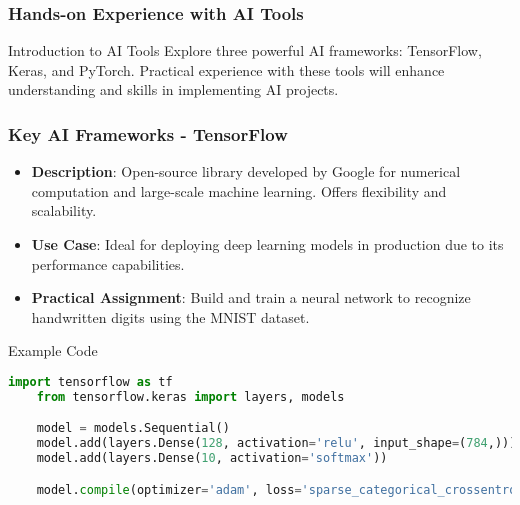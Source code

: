 \documentclass{beamer}
\begin{document}
\begin{frame}
    \frametitle{Hands-on Experience with AI Tools}
    \begin{block}{Introduction to AI Tools}
        Explore three powerful AI frameworks: TensorFlow, Keras, and PyTorch. 
        Practical experience with these tools will enhance understanding and skills in implementing AI projects.
    \end{block}
\end{frame}

\begin{frame}
    \frametitle{Key AI Frameworks - TensorFlow}
    \begin{itemize}
        \item \textbf{Description}: Open-source library developed by Google for numerical computation and large-scale machine learning. Offers flexibility and scalability.
        \item \textbf{Use Case}: Ideal for deploying deep learning models in production due to its performance capabilities.
        \item \textbf{Practical Assignment}: Build and train a neural network to recognize handwritten digits using the MNIST dataset.
    \end{itemize}
    \begin{block}{Example Code}
    \begin{lstlisting}[language=Python]
    import tensorflow as tf
    from tensorflow.keras import layers, models

    model = models.Sequential()
    model.add(layers.Dense(128, activation='relu', input_shape=(784,)))
    model.add(layers.Dense(10, activation='softmax'))

    model.compile(optimizer='adam', loss='sparse_categorical_crossentropy', metrics=['accuracy'])
    \end{lstlisting}
    \end{block}
\end{frame}
\end{document}
